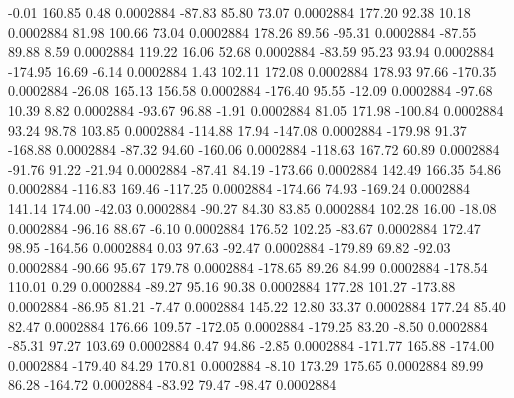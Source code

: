        -0.01      160.85        0.48     0.0002884
      -87.83       85.80       73.07     0.0002884
      177.20       92.38       10.18     0.0002884
       81.98      100.66       73.04     0.0002884
      178.26       89.56      -95.31     0.0002884
      -87.55       89.88        8.59     0.0002884
      119.22       16.06       52.68     0.0002884
      -83.59       95.23       93.94     0.0002884
     -174.95       16.69       -6.14     0.0002884
        1.43      102.11      172.08     0.0002884
      178.93       97.66     -170.35     0.0002884
      -26.08      165.13      156.58     0.0002884
     -176.40       95.55      -12.09     0.0002884
      -97.68       10.39        8.82     0.0002884
      -93.67       96.88       -1.91     0.0002884
       81.05      171.98     -100.84     0.0002884
       93.24       98.78      103.85     0.0002884
     -114.88       17.94     -147.08     0.0002884
     -179.98       91.37     -168.88     0.0002884
      -87.32       94.60     -160.06     0.0002884
     -118.63      167.72       60.89     0.0002884
      -91.76       91.22      -21.94     0.0002884
      -87.41       84.19     -173.66     0.0002884
      142.49      166.35       54.86     0.0002884
     -116.83      169.46     -117.25     0.0002884
     -174.66       74.93     -169.24     0.0002884
      141.14      174.00      -42.03     0.0002884
      -90.27       84.30       83.85     0.0002884
      102.28       16.00      -18.08     0.0002884
      -96.16       88.67       -6.10     0.0002884
      176.52      102.25      -83.67     0.0002884
      172.47       98.95     -164.56     0.0002884
        0.03       97.63      -92.47     0.0002884
     -179.89       69.82      -92.03     0.0002884
      -90.66       95.67      179.78     0.0002884
     -178.65       89.26       84.99     0.0002884
     -178.54      110.01        0.29     0.0002884
      -89.27       95.16       90.38     0.0002884
      177.28      101.27     -173.88     0.0002884
      -86.95       81.21       -7.47     0.0002884
      145.22       12.80       33.37     0.0002884
      177.24       85.40       82.47     0.0002884
      176.66      109.57     -172.05     0.0002884
     -179.25       83.20       -8.50     0.0002884
      -85.31       97.27      103.69     0.0002884
        0.47       94.86       -2.85     0.0002884
     -171.77      165.88     -174.00     0.0002884
     -179.40       84.29      170.81     0.0002884
       -8.10      173.29      175.65     0.0002884
       89.99       86.28     -164.72     0.0002884
      -83.92       79.47      -98.47     0.0002884
